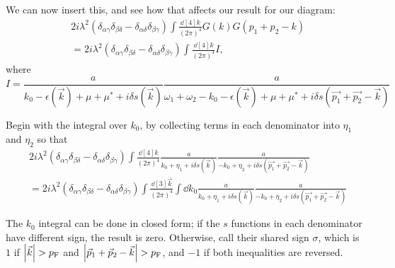 \documentclass{article}
\newcommand{\corr}{\mu^\ast}
\begin{document}
We can now insert this, and see how that affects our result for our diagram:
\begin{align}
	&2 i \lambda^2 \left(\delta_{\alpha\gamma} \delta_{\beta\delta} -  \delta_{\alpha\delta} \delta_{\beta \gamma}\right)\int \frac{\dd[4]{k}}{\left(2\pi\right)^4} G(k) G(p_1 + p_2 - k) \\
	&= 2 i \lambda^2 \left(\delta_{\alpha\gamma} \delta_{\beta\delta} -  \delta_{\alpha\delta} \delta_{\beta \gamma}\right)\int \frac{\dd[4]{k}}{\left(2\pi\right)^4} I,
\end{align}
where
\begin{equation}
	I = \frac{a}{k_0 - \epsilon(\vec{k}) + \mu + \corr + i \delta s(\vec{k})} \frac{a}{\omega_1 + \omega_2 - k_0 - \epsilon(\vec{k}) + \mu + \corr + i \delta s(\vec{p_1} + \vec{p_2} - \vec{k})}
\end{equation}

Begin with the integral over $k_0$, by collecting terms in each denominator into $\eta_1$ and $\eta_2$ so that
\begin{align}
	& 2 i \lambda^2 \left(\delta_{\alpha\gamma} \delta_{\beta\delta} -  \delta_{\alpha\delta} \delta_{\beta \gamma}\right)\int \frac{\dd[4]{k}}{\left(2\pi\right)^4} \frac{a}{k_0 + \eta_1 + i \delta s(\vec{k})} \frac{a}{- k_0 + \eta_2 + i \delta s(\vec{p_1} + \vec{p_2} - \vec{k})} \\
	&= 2 i \lambda^2 \left(\delta_{\alpha\gamma} \delta_{\beta\delta} -  \delta_{\alpha\delta} \delta_{\beta \gamma}\right)\int \frac{\dd[3]{\vec{k}}}{\left(2\pi\right)^4} \int \dd{k_0} \frac{a}{k_0 + \eta_1 + i \delta s(\vec{k})} \frac{a}{ - k_0 + \eta_2 + i \delta s(\vec{p_1} + \vec{p_2} - \vec{k})}
\end{align}

The $k_0$ integral can be done in closed form;
if the $s$ functions in each denominator have different sign, the result is zero.
Otherwise, call their shared sign $\sigma$, which is $1$ if $\abs{\vec{k}} > p_\mathrm{F}$ and $\abs{\vec{p}_1 + \vec{p}_2 - \vec{k}} > p_\mathrm{F}$, and $-1$ if both inequalities are reversed.
\end{document}
